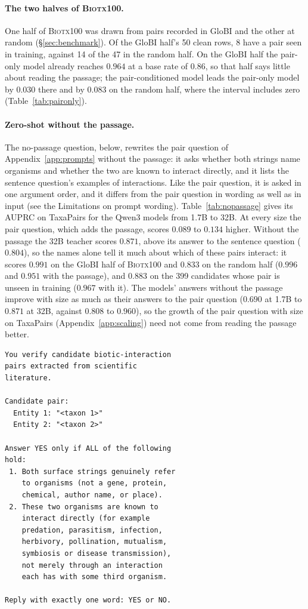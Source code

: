 \documentclass[11pt]{article}
\newcommand{\bench}{\mbox{TaxaPairs}}
\begin{document}
\paragraph{The two halves of \textsc{Biotx100}.}
One half of \textsc{Biotx100} was drawn from pairs recorded in GloBI and the other at random
(\S\ref{sec:benchmark}). Of the GloBI half's 50 clean rows, 8 have a pair seen in training, against
14 of the 47 in the random half. On the GloBI half the pair-only model already reaches $0.964$ at a
base rate of $0.86$, so that half says little about reading the passage; the pair-conditioned model
leads the pair-only model by $0.030$ there and by $0.083$ on the random half, where the interval
includes zero (Table~\ref{tab:paironly}).

\paragraph{Zero-shot without the passage.}
The no-passage question, below, rewrites the pair question of Appendix~\ref{app:prompts} without the
passage: it asks whether both strings name organisms and whether the two are known to interact
directly, and it lists the sentence question's examples of interactions. Like the pair question, it
is asked in one argument order, and it differs from the pair question in wording as well as in input
(see the Limitations on prompt wording). Table~\ref{tab:nopassage} gives its AUPRC on \bench{} for
the Qwen3 models from 1.7B to 32B\@. At every size the pair question, which adds the passage, scores
$0.089$ to $0.134$ higher. Without the passage the 32B teacher scores $0.871$, above its answer to
the sentence question ($0.804$), so the names alone tell it much about which of these pairs
interact: it scores $0.991$ on the GloBI half of \textsc{Biotx100} and $0.833$ on the random half
($0.996$ and $0.951$ with the passage), and $0.883$ on the 399 candidates whose pair is unseen in training ($0.967$
with it). The models' answers without the passage improve with size as much as their answers to the
pair question ($0.690$ at 1.7B to $0.871$ at 32B, against $0.808$ to $0.960$), so the growth of the
pair question with size on \bench{} (Appendix~\ref{app:scaling}) need not come from reading the passage better.

\begin{footnotesize}
\begin{verbatim}
You verify candidate biotic-interaction
pairs extracted from scientific
literature.

Candidate pair:
  Entity 1: "<taxon 1>"
  Entity 2: "<taxon 2>"

Answer YES only if ALL of the following
hold:
 1. Both surface strings genuinely refer
    to organisms (not a gene, protein,
    chemical, author name, or place).
 2. These two organisms are known to
    interact directly (for example
    predation, parasitism, infection,
    herbivory, pollination, mutualism,
    symbiosis or disease transmission),
    not merely through an interaction
    each has with some third organism.

Reply with exactly one word: YES or NO.
\end{verbatim}
\end{footnotesize}
\end{document}
